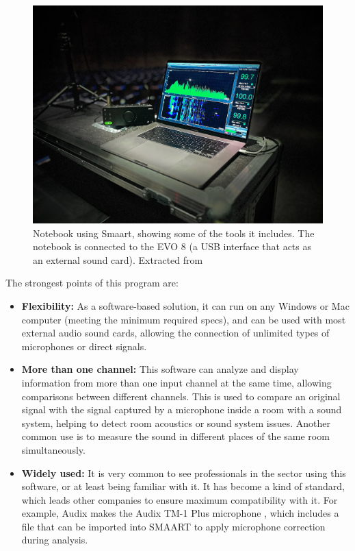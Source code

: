 \begin{figure}[H]
	\centering
	\includegraphics[width=0.9
	\linewidth]{Figures/smaart_01.png}
	\caption [Notebook using Smaart]{Notebook using Smaart, showing some of the tools it includes. The notebook is connected to the EVO 8 (a USB interface that acts as an external sound card). Extracted from \cite{smaart_image}}
	\label{fig:SMAART}
\end{figure}
	
The strongest points of this program are:

\begin{itemize}
	\item \textbf{Flexibility:} As a software-based solution, it can run on any Windows or Mac computer (meeting the minimum required specs), and can be used with most external audio sound cards, allowing the connection of unlimited types of microphones or direct signals.
	
	\item \textbf{More than one channel:} This software can analyze and display information from more than one input channel at the same time, allowing comparisons between different channels. This is used to compare an original signal with the signal captured by a microphone inside a room with a sound system, helping to detect room acoustics or sound system issues. Another common use is to measure the sound in different places of the same room simultaneously.
	
	\item \textbf{Widely used:} It is very common to see professionals in the sector using this software, or at least being familiar with it. It has become a kind of standard, which leads other companies to ensure maximum compatibility with it. For example, Audix makes the Audix TM-1 Plus microphone \cite{AudixTM1}, which includes a file that can be imported into SMAART to apply microphone correction during analysis.
\end{itemize}


